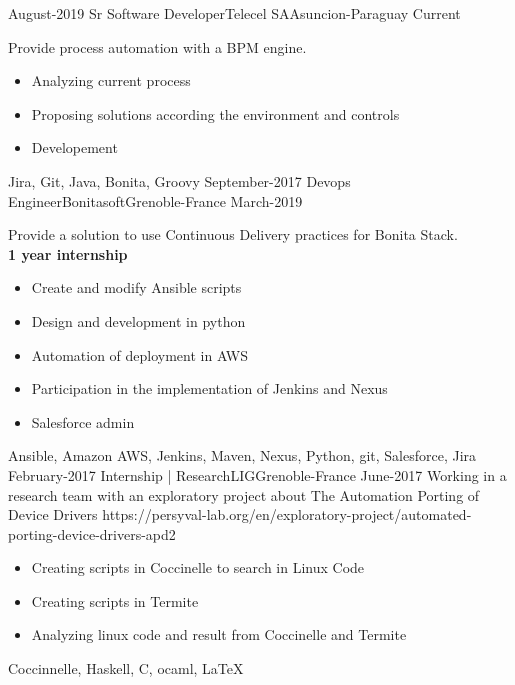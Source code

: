 %
%
%
\begin{experiences}
 \experience
    {August-2019}   {Sr Software Developer}{Telecel SA}{Asuncion-Paraguay}
    {Current} {Provide process automation with a BPM engine.
                      \begin{itemize}
                          \item Analyzing current process
                          \item Proposing solutions according the environment and controls
                          \item Developement
                       \end{itemize}
                  }
                      {Jira, Git, Java, Bonita, Groovy}
  \emptySeparator
  \experience
    {September-2017}   {Devops Engineer}{Bonitasoft}{Grenoble-France}
    {March-2019}
                    {Provide a solution to use Continuous Delivery practices for Bonita Stack. \\
                    \textbf{\small 1 year internship}
                    \begin{itemize}
                        \item Create and modify Ansible scripts
                        \item Design and development in python
                        \item Automation of deployment in AWS
                        \item Participation in the implementation of Jenkins and Nexus
                        \item Salesforce admin
                      \end{itemize}}
                    {Ansible, Amazon AWS, Jenkins, Maven, Nexus, Python, git, Salesforce, Jira}
  \emptySeparator
    \projectexperiences
    {February-2017}   {Internship | Research}{LIG}{Grenoble-France}
    {June-2017}
                    {Working in a research team with an exploratory project about The Automation Porting of Device Drivers \tiny{https://persyval-lab.org/en/exploratory-project/automated-porting-device-drivers-apd2}}
                    {
                    \begin{itemize}
                        \item Creating scripts in Coccinelle to search in Linux Code
                        \item Creating scripts in Termite
                        \item Analyzing linux code and result from Coccinelle and Termite
                      \end{itemize}
                     }
                    {Coccinnelle, Haskell, C, ocaml, \LaTeX}
  \emptySeparator


\end{experiences}

